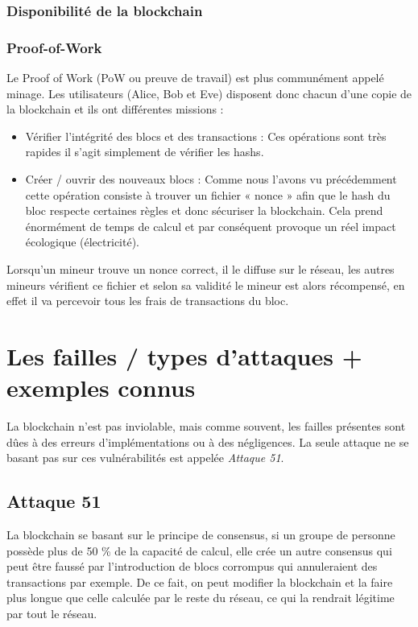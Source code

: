 \documentclass[12pt, a4paper, oneside]{book}
\begin{document}
    \newpage

    \subsection{Disponibilité de la blockchain}

    \subsection{Proof-of-Work}

    Le Proof of Work (PoW ou preuve de travail) est plus communément appelé minage. Les utilisateurs (Alice, Bob et Eve) disposent donc chacun d’une copie de la blockchain et ils ont différentes missions :

    \begin{itemize}
        \item Vérifier l’intégrité des blocs et des transactions : Ces opérations sont très rapides il s’agit simplement de vérifier les hashs.
        \item Créer / ouvrir des nouveaux blocs : Comme nous l’avons vu précédemment cette opération consiste à trouver un fichier « nonce » afin que le hash du bloc respecte certaines règles et donc sécuriser la blockchain. Cela prend énormément de temps de calcul et par conséquent provoque un réel impact écologique (électricité).
        \newline
    \end{itemize}

    Lorsqu’un mineur trouve un nonce correct, il le diffuse sur le réseau, les autres mineurs vérifient ce fichier et selon sa validité le mineur est alors récompensé, en effet il va percevoir tous les frais de transactions du bloc.

    \chapter{Les failles / types d'attaques + exemples connus}
    La blockchain n'est pas inviolable, mais comme souvent, les failles présentes sont dûes à des erreurs d'implémentations ou à des négligences. La seule attaque ne se basant pas sur ces vulnérabilités est appelée \emph{Attaque 51}.
    \section{Attaque 51}
    La blockchain se basant sur le principe de consensus, si un groupe de personne possède plus de 50 \% de la capacité de calcul, elle crée un autre consensus qui peut être faussé par l'introduction de blocs corrompus qui annuleraient des transactions par exemple. De ce fait, on peut modifier la blockchain et la faire plus longue que celle calculée par le reste du réseau, ce qui la rendrait légitime par tout le réseau.
\end{document}
